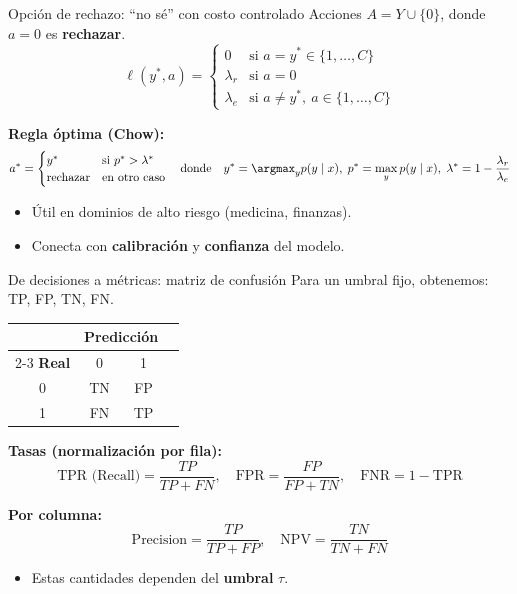 \begin{frame}{Opción de rechazo: “no sé” con costo controlado}
Acciones \(A=Y\cup\{0\}\), donde \(a=0\) es \textbf{rechazar}.
\[
\ell(y^*,a)=
\begin{cases}
0 & \text{si } a=y^* \in \{1,\dots,C\}\\
\lambda_r & \text{si } a=0\\
\lambda_e & \text{si } a\neq y^*,\ a\in \{1,\dots,C\}
\end{cases}
\]

\textbf{Regla óptima (Chow):}
\[
a^*=
\begin{cases}
 y^* & \text{si } p^*>\lambda^*\\
\text{rechazar} & \text{en otro caso}
\end{cases}
\quad\text{donde}\quad
 y^*=\argmax_y p(y\mid x),\; p^*=\max_y p(y\mid x),\;
\lambda^*=1-\frac{\lambda_r}{\lambda_e}
\]

\begin{itemize}
  \item Útil en dominios de alto riesgo (medicina, finanzas).
  \item Conecta con \textbf{calibración} y \textbf{confianza} del modelo.
\end{itemize}
\end{frame}

\begin{frame}{De decisiones a métricas: matriz de confusión}
Para un umbral fijo, obtenemos: TP, FP, TN, FN.

\begin{center}
\begin{tabular}{c ccc}
\toprule
 & \multicolumn{2}{c}{\textbf{Predicción}}\\
\cmidrule(lr){2-3}
\textbf{Real} & 0 & 1\\
\midrule
0 & TN & FP\\
1 & FN & TP\\
\bottomrule
\end{tabular}
\end{center}

\textbf{Tasas (normalización por fila):}
\[
\text{TPR (Recall)}=\frac{TP}{TP+FN},\quad
\text{FPR}=\frac{FP}{FP+TN},\quad
\text{FNR}=1-\text{TPR}
\]

\textbf{Por columna:}
\[
\text{Precision}=\frac{TP}{TP+FP},\quad
\text{NPV}=\frac{TN}{TN+FN}
\]

\begin{itemize}
  \item Estas cantidades dependen del \textbf{umbral} \(\tau\).
\end{itemize}
\end{frame}

